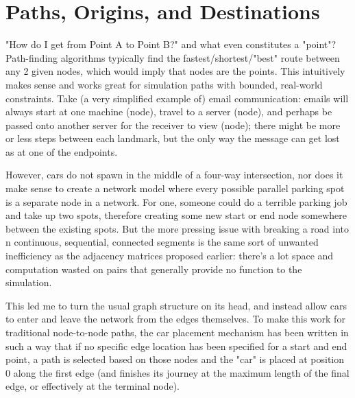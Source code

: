 \section{Paths, Origins, and Destinations}

\par "How do I get from Point A to Point B?" and what even constitutes a "point"?  Path-finding algorithms typically find the fastest/shortest/"best" route between any 2 given nodes, which would imply that nodes are the points. This intuitively makes sense and works great for simulation paths with bounded, real-world constraints.  Take (a very simplified example of) email communication:  emails will always start at one machine (node), travel to a server (node), and perhaps be passed onto another server for the receiver to view (node); there might be more or less steps between each landmark, but the only way the message can get lost as at one of the endpoints.  \\

\par However, cars do not spawn in the middle of a four-way intersection, nor does it make sense to create a network model where every possible parallel parking spot is a separate node in a network.  For one, someone could do a terrible parking job and take up two spots, therefore creating some new start or end node somewhere between the existing spots.  But the more pressing issue with breaking a road into n continuous, sequential, connected segments is the same sort of unwanted inefficiency as the adjacency matrices proposed earlier:  there's a lot space and computation wasted on pairs that generally provide no function to the simulation. \\

\par This led me to turn the usual graph structure on its head, and instead allow cars to enter and leave the network from the edges themselves.  To make this work for traditional node-to-node paths, the car placement mechanism has been written in such a way that if no specific edge location has been specified for a start and end point, a path is selected based on those nodes and the "car" is placed at position 0 along the first edge (and finishes its journey at the maximum length of the final edge, or effectively at the terminal node).

